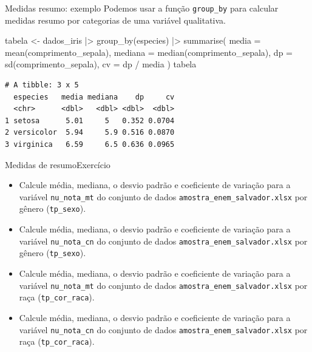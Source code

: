 \documentclass[
  10pt,
  ignorenonframetext,
]{beamer}
\newenvironment{Shaded}{\begin{snugshade}}{\end{snugshade}}
\newcommand{\AttributeTok}[1]{\textcolor[rgb]{0.40,0.45,0.13}{#1}}
\newcommand{\FunctionTok}[1]{\textcolor[rgb]{0.28,0.35,0.67}{#1}}
\newcommand{\NormalTok}[1]{\textcolor[rgb]{0.00,0.23,0.31}{#1}}
\newcommand{\OtherTok}[1]{\textcolor[rgb]{0.00,0.23,0.31}{#1}}
\newcommand{\SpecialCharTok}[1]{\textcolor[rgb]{0.37,0.37,0.37}{#1}}
\providecommand{\tightlist}{%
  \setlength{\itemsep}{0pt}\setlength{\parskip}{0pt}}\usepackage{longtable,booktabs,array}
\begin{document}
\begin{frame}[fragile]{Medidas resumo: exemplo}
\protect\hypertarget{medidas-resumo-exemplo-1}{}
Podemos usar a função \texttt{group\_by} para calcular medidas resumo
por categorias de uma variável qualitativa.

\begin{Shaded}
\begin{Highlighting}[]
\NormalTok{tabela }\OtherTok{\textless{}{-}}\NormalTok{ dados\_iris }\SpecialCharTok{|\textgreater{}}
  \FunctionTok{group\_by}\NormalTok{(especies) }\SpecialCharTok{|\textgreater{}}
  \FunctionTok{summarise}\NormalTok{(}
    \AttributeTok{media =} \FunctionTok{mean}\NormalTok{(comprimento\_sepala),}
    \AttributeTok{mediana =} \FunctionTok{median}\NormalTok{(comprimento\_sepala),}
    \AttributeTok{dp =} \FunctionTok{sd}\NormalTok{(comprimento\_sepala),}
    \AttributeTok{cv =}\NormalTok{ dp }\SpecialCharTok{/}\NormalTok{ media}
\NormalTok{  )}
\NormalTok{tabela}
\end{Highlighting}
\end{Shaded}

\begin{verbatim}
# A tibble: 3 x 5
  especies   media mediana    dp     cv
  <chr>      <dbl>   <dbl> <dbl>  <dbl>
1 setosa      5.01     5   0.352 0.0704
2 versicolor  5.94     5.9 0.516 0.0870
3 virginica   6.59     6.5 0.636 0.0965
\end{verbatim}
\end{frame}

\begin{frame}[fragile]{Medidas de resumo\newline Exercício}
\protect\hypertarget{medidas-de-resumoexercuxedcio}{}
\begin{itemize}
\tightlist
\item
  Calcule média, mediana, o desvio padrão e coeficiente de variação para
  a variável \texttt{nu\_nota\_mt} do conjunto de dados
  \texttt{amostra\_enem\_salvador.xlsx} por gênero (\texttt{tp\_sexo}).
\item
  Calcule média, mediana, o desvio padrão e coeficiente de variação para
  a variável \texttt{nu\_nota\_cn} do conjunto de dados
  \texttt{amostra\_enem\_salvador.xlsx} por gênero (\texttt{tp\_sexo}).
\item
  Calcule média, mediana, o desvio padrão e coeficiente de variação para
  a variável \texttt{nu\_nota\_mt} do conjunto de dados
  \texttt{amostra\_enem\_salvador.xlsx} por raça
  (\texttt{tp\_cor\_raca}).
\item
  Calcule média, mediana, o desvio padrão e coeficiente de variação para
  a variável \texttt{nu\_nota\_cn} do conjunto de dados
  \texttt{amostra\_enem\_salvador.xlsx} por raça
  (\texttt{tp\_cor\_raca}).
\end{itemize}
\end{frame}
\end{document}
